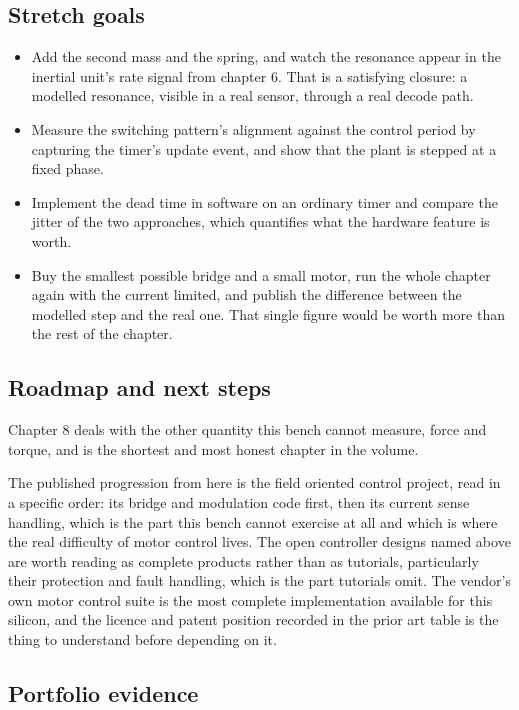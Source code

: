 \subsection*{Stretch goals}

\begin{itemize}
\item Add the second mass and the spring, and watch the resonance appear in the
inertial unit's rate signal from chapter 6. That is a satisfying closure: a
modelled resonance, visible in a real sensor, through a real decode path.
\item Measure the switching pattern's alignment against the control period by
capturing the timer's update event, and show that the plant is stepped at a
fixed phase.
\item Implement the dead time in software on an ordinary timer and compare the
jitter of the two approaches, which quantifies what the hardware feature is
worth.
\item Buy the smallest possible bridge and a small motor, run the whole chapter
again with the current limited, and publish the difference between the modelled
step and the real one. That single figure would be worth more than the rest of
the chapter.
\end{itemize}

\subsection*{Roadmap and next steps}

Chapter 8 deals with the other quantity this bench cannot measure, force and
torque, and is the shortest and most honest chapter in the volume.

The published progression from here is the field oriented control project,
read in a specific order: its bridge and modulation code first, then its
current sense handling, which is the part this bench cannot exercise at all and
which is where the real difficulty of motor control lives. The open controller
designs named above are worth reading as complete products rather than as
tutorials, particularly their protection and fault handling, which is the part
tutorials omit. The vendor's own motor control suite is the most complete
implementation available for this silicon, and the licence and patent position
recorded in the prior art table is the thing to understand before depending on
it.

\subsection*{Portfolio evidence}

